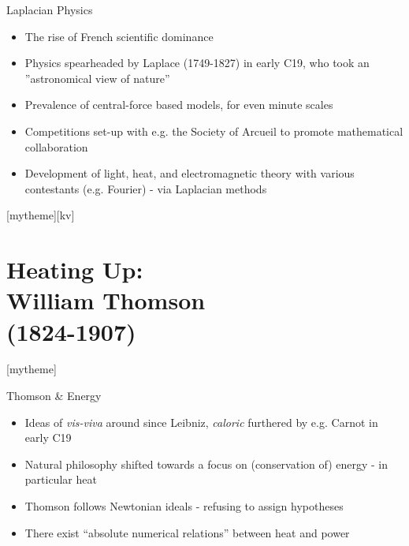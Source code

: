 \documentclass{beamer}
\newcommand{\sectionpic}[2]{
   \setbeamertemplate{section page}[mytheme][#2]
   \section{#1}
   \setbeamertemplate{section page}[mytheme]
}
\begin{document}
\begin{frame}{Laplacian Physics}
\begin{itemize}
	\item The rise of French scientific dominance
	\item Physics spearheaded by Laplace (1749-1827) in early C19, who took an ''astronomical view of nature''{ \autocite{merz}}
	\item Prevalence of central-force based models, for even minute scales{ \autocite{foxl}}
	\item Competitions set-up with e.g. the Society of Arcueil to promote mathematical collaboration
	\item Development of light, heat, and electromagnetic theory with various contestants (e.g. Fourier) - via Laplacian methods
\end{itemize}
\end{frame}
  \sectionpic{Heating Up:\\ William Thomson\\\scriptsize{(1824-1907)}}{kv}
\begin{frame}{Thomson \& Energy}
	\begin{itemize}
		\item Ideas of \emph{vis-viva} around since Leibniz, \emph{caloric} furthered by e.g. Carnot in early C19
		\item Natural philosophy shifted towards a focus on (conservation of) energy - in particular heat{ \autocite{newchart}}
		\item Thomson follows Newtonian ideals - refusing to assign hypotheses
		\item There exist ``absolute numerical relations'' between heat and power{\only \autocite{thomdynam}}
	\end{itemize}
\end{frame}
\end{document}
